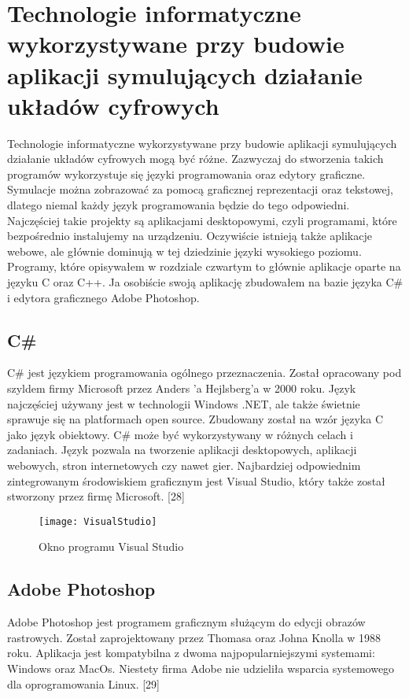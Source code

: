 \documentclass[12pt, a4paper, onside, polish]{article}				%
\begin{document}
\cleardoublepage



\section{Technologie informatyczne wykorzystywane przy budowie aplikacji symulujących działanie układów cyfrowych}
\hspace{\parindent}
Technologie informatyczne wykorzystywane przy budowie aplikacji symulujących działanie układów cyfrowych mogą być różne. Zazwyczaj do stworzenia takich programów wykorzystuje się języki programowania oraz edytory graficzne. Symulacje można zobrazować za pomocą graficznej reprezentacji oraz tekstowej, dlatego niemal każdy język programowania będzie do tego odpowiedni. Najczęściej takie projekty są aplikacjami desktopowymi, czyli programami, które bezpośrednio instalujemy na urządzeniu. Oczywiście istnieją także aplikacje webowe, ale głównie dominują w tej dziedzinie języki wysokiego poziomu. Programy, które opisywałem w rozdziale czwartym to głównie aplikacje oparte na języku C oraz C++. Ja osobiście swoją aplikację zbudowałem na bazie języka C\# i edytora graficznego Adobe Photoshop.  
\subsection{C\#}
\hspace{\parindent}
C\# jest językiem programowania ogólnego przeznaczenia. Został opracowany pod szyldem firmy Microsoft przez Anders 'a Hejlsberg’a w 2000 roku. Język najczęściej używany jest w technologii Windows .NET, ale także świetnie sprawuje się na platformach open source. Zbudowany został na wzór języka C jako język obiektowy. C\# może być wykorzystywany w różnych celach i zadaniach. Język pozwala na tworzenie aplikacji desktopowych, aplikacji webowych, stron internetowych czy nawet gier. Najbardziej odpowiednim zintegrowanym środowiskiem graficznym jest Visual Studio, który także został stworzony przez firmę Microsoft. [28]
   	\begin{figure}[H]
  	  {\centering \texttt{[image: VisualStudio]} \caption{Okno programu Visual Studio}}\vspace{5mm}
  	 \end{figure}




\subsection{Adobe Photoshop}
\hspace{\parindent}
Adobe Photoshop jest programem graficznym służącym do edycji obrazów rastrowych. Został zaprojektowany przez Thomasa oraz Johna Knolla w 1988 roku. Aplikacja jest kompatybilna z dwoma najpopularniejszymi systemami: Windows oraz MacOs. Niestety firma Adobe nie udzieliła wsparcia systemowego dla oprogramowania Linux. [29]  
\end{document}
